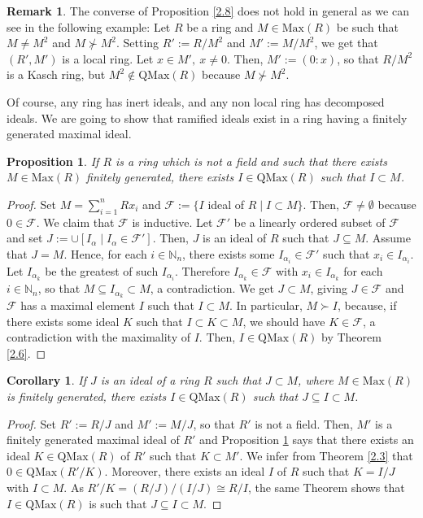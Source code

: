 \documentclass[12pt,leqno]{amsart}
\newtheorem{proposition}[theorem]{Proposition}
\newtheorem{corollary}[theorem]{Corollary}
\theoremstyle{definition}
\newtheorem{remark}[theorem]{Remark}
\begin{document}
\begin{remark}\label{2.81} The converse of Proposition \ref{2.8} does not hold in general as we can see in the following example: Let $R$ be a ring and $M\in\mathrm{Max}(R)$ be such that $M\neq M^2$ and $M\nsucc M ^2$. Setting $R':=R/M^2$ and $M':=M/M^2$, we get that $(R',M')$ is a local ring. Let $x\in M',\ x\neq 0$. Then, $M':=(0:x)$, so that $R/M^2$ is a  Kasch ring, but $M^2\not\in\mathrm{QMax}(R)$ because $M\nsucc M^2$.
\end{remark}

Of course, any ring has inert ideals, and any non local ring has decomposed ideals. We are going to show that ramified ideals exist in a ring having a finitely generated maximal ideal. 

\begin{proposition}\label{2.9} If $R$ is a ring which is not a field and such that there exists $M\in\mathrm{Max}(R)$ finitely generated, there exists $I\in\mathrm {QMax}(R)$ such that $I\subset M$.
\end{proposition}
\begin{proof} Set $M=\sum_{i=1}^nRx_i$ and $\mathcal F:=\{I$ ideal of $R\mid I\subset M\}$. Then, $\mathcal F\neq\emptyset$ because $0\in\mathcal F$. We claim that $\mathcal F$ is inductive. Let $\mathcal F'$ be a linearly ordered subset of $\mathcal F$ and set $J:=\cup[I_{\alpha}\mid I_{\alpha}\in\mathcal F']$. Then, $J$ is an ideal of $R$ such that $J\subseteq M$. Assume that $J=M$. Hence, for each $i\in\mathbb{N}_n$, there exists some $I_{\alpha_i}\in\mathcal F'$ such that $x_i\in I_{\alpha_i}$. Let $I_{\alpha_k}$ be the greatest of such $I_{\alpha_i}$. Therefore $I_ {\alpha_k}\in\mathcal F$ with $x_i\in I_{\alpha_k}$ for each $i\in\mathbb{N}_n$, so that $M\subseteq I_{\alpha_k}\subset M$, a contradiction. We get $J\subset M$, giving $J\in\mathcal F$ and $\mathcal F$ has a maximal element $I$ such that $I\subset M$. In particular, $M\succ I$, because, if there exists some ideal $K$ such that $I\subset K\subset M$, we should have $K\in\mathcal F$, a contradiction with the maximality of $I$. Then, $I\in\mathrm{QMax}(R)$ by Theorem \ref{2.6}.
\end{proof}

\begin{corollary}\label{2.10} If $J$ is an ideal of a ring $R$ such that $J\subset M$, where $M\in\mathrm{Max}(R)$ is finitely generated, there exists $I\in\mathrm {QMax}(R)$ such that $J\subseteq  I\subset M$. 
\end{corollary}
\begin{proof} Set $R':=R/J$ and $M':=M/J$, so that $R'$ is not a field. Then, $M'$ is a finitely generated maximal ideal of $R'$ and Proposition \ref{2.9} says that there exists an ideal $K\in\mathrm{QMax}(R)$ of $R'$
 such that $K\subset M'$. We infer from Theorem \ref{2.3} that $0\in\mathrm{QMax}(R'/K)$. Moreover, there exists an ideal $I$ of $R$ such that $K=I/J$ with $I\subset M$. As $R'/K=(R/J)/(I/J)\cong R/I$, the same Theorem shows that $I\in\mathrm{QMax}(R)$ is such that $J\subseteq I\subset M$.
\end{proof}
\end{document}
